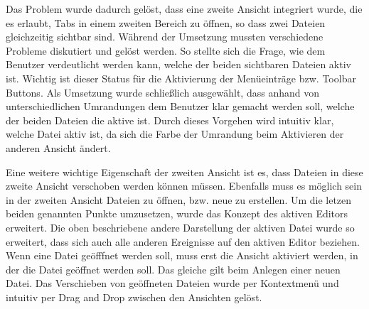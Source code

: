 Das Problem wurde dadurch gelöst, dass eine zweite Ansicht integriert wurde,
die es erlaubt, Tabs in einem zweiten Bereich zu öffnen, so dass zwei Dateien
gleichzeitig sichtbar sind. Während der Umsetzung mussten verschiedene Probleme
diskutiert und gelöst werden. So stellte sich die Frage, wie dem Benutzer
verdeutlicht werden kann, welche der beiden sichtbaren Dateien aktiv ist.
Wichtig ist dieser Status für die Aktivierung der Menüeinträge bzw. Toolbar
Buttons. Als Umsetzung wurde schließlich ausgewählt, dass anhand von
unterschiedlichen Umrandungen dem Benutzer klar gemacht werden soll, welche der
beiden Dateien die aktive ist. Durch dieses Vorgehen wird intuitiv klar, welche
Datei aktiv ist, da sich die Farbe der Umrandung beim Aktivieren der anderen
Ansicht ändert.\vspace{10pt}

Eine weitere wichtige Eigenschaft der zweiten Ansicht ist es, dass Dateien in
diese zweite Ansicht verschoben werden können müssen. Ebenfalls muss es möglich
sein in der zweiten Ansicht Dateien zu öffnen, bzw. neue zu erstellen. Um die
letzen beiden genannten Punkte umzusetzen, wurde das Konzept des aktiven
Editors erweitert. Die oben beschriebene andere Darstellung der aktiven Datei
wurde so erweitert, dass sich auch alle anderen Ereignisse auf den aktiven
Editor beziehen. Wenn eine Datei geöfffnet werden soll, muss erst die Ansicht
aktiviert werden, in der die Datei geöffnet werden soll. Das gleiche gilt beim
Anlegen einer neuen Datei. Das Verschieben von geöffneten Dateien wurde per
Kontextmenü und intuitiv per Drag and Drop zwischen den Ansichten gelöst.
